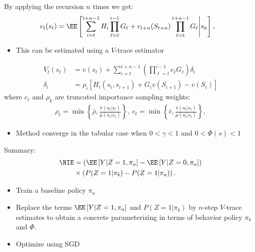 \begin{frame}
By applying the recursion $n$ times we get:
\begin{align*}  
	v_t(s_t) & =\EE\left[ \sum_{i=t}^{t+n-1} H_i \prod_{\ell=t}^{i-1} G_\ell + v_{t+n}(S_{t+n})  \prod_{\ell = t}^{ t+n-1} G_\ell   \middle| s_k\right], %
\end{align*}
\begin{itemize}
	\item This can be estimated using a $V$-trace estimator~\citep{espeholt2018impala}
\end{itemize}
\begin{subequations}
	\begin{align*}
		V_t(s_t) &= v(s_t) + \sum_{i=t}^{t+n-1} \left( \prod_{\ell=t}^{i-1} c_\ell G_{\ell} \right)	\delta_i  \\
		\delta_i & = \rho_i \left[ H_i(s_i, s_{i+1}) + G_i v(S_{i+1})- v(S_i) \right]  
	\end{align*} %
\end{subequations}
where $c_\ell$ and $\rho_k$ are truncated importance sampling weights: 
\begin{align*} 
	\rho_t = \min\left\{\bar \rho, \frac{\pi(a_t | s_t)  }{\mu(a_t | s_t) }  \right\},\
	c_t = \min\left\{\bar c, \frac{\pi(a_t | s_t)  }{\mu(a_t | s_t) }  \right\}, \nonumber
\end{align*}
\begin{itemize}
	\item Method converge in the tabular case when $0< \gamma < 1$ and $0 < \Phi(s) < 1$
\end{itemize}
\end{frame}

\begin{frame}{Summary:}
\begin{align*}
	\NIE & = \left( \EE\left[Y | Z=1, \pi_a \right] - \EE\left[Y | Z=0, \pi_a \right] \right)  \\  
	& \times  \left( P(Z=1| \pi_b) -P(Z=1| \pi_a) \right).%
\end{align*}
\begin{itemize}
	\item Train a baseline policy $\pi_a$
\item Replace the terms $\EE\left[Y | Z=1, \pi_a \right]$ and $P(Z=1| \pi_b)$ by $n$-step $V$-trace estimates to obtain a concrete parameterizing in terms of behavior policy $\pi_b$ and $\Phi$. 
\item Optimize using SGD
\end{itemize}
\end{frame}

